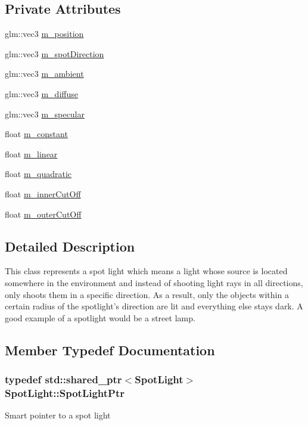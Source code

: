 \subsection*{Private Attributes}
\begin{DoxyCompactItemize}
\item 
glm\+::vec3 \hyperlink{classSpotLight_ab10a89bbb4076364f7f028b750207522}{m\+\_\+position}
\item 
glm\+::vec3 \hyperlink{classSpotLight_ae950bb31005fc7d62232bfc78d1ef8f6}{m\+\_\+spot\+Direction}
\item 
glm\+::vec3 \hyperlink{classSpotLight_a8120c87715c0d55a139562b01f0af3c6}{m\+\_\+ambient}
\item 
glm\+::vec3 \hyperlink{classSpotLight_aba029b38f4ee2b6942bc7c2819621cef}{m\+\_\+diffuse}
\item 
glm\+::vec3 \hyperlink{classSpotLight_a6814d385600a409b73a2877afd545136}{m\+\_\+specular}
\item 
float \hyperlink{classSpotLight_a34d9b43d8bfe559da5d13566ca7882f9}{m\+\_\+constant}
\item 
float \hyperlink{classSpotLight_a9127c53d783524782e2a6f31b8702173}{m\+\_\+linear}
\item 
float \hyperlink{classSpotLight_a6d81863546c671662f84b71a15328654}{m\+\_\+quadratic}
\item 
float \hyperlink{classSpotLight_a9b7c5db8293b0bab65df4474a578bb5d}{m\+\_\+inner\+Cut\+Off}
\item 
float \hyperlink{classSpotLight_a48ede6ee3dc2397941d4d8b96e6bd76a}{m\+\_\+outer\+Cut\+Off}
\end{DoxyCompactItemize}


\subsection{Detailed Description}
This class represents a spot light which means a light whose source is located somewhere in the environment and instead of shooting light rays in all directions, only shoots them in a specific direction. As a result, only the objects within a certain radius of the spotlight's direction are lit and everything else stays dark. A good example of a spotlight would be a street lamp. 

\subsection{Member Typedef Documentation}
\hypertarget{classSpotLight_ac20419604c70594b85e7c019effd1998}{
\subsubsection[{Spot\+Light\+Ptr}]{\setlength{\rightskip}{0pt plus 5cm}typedef std\+::shared\+\_\+ptr$<${\bf Spot\+Light}$>$ {\bf Spot\+Light\+::\+Spot\+Light\+Ptr}}}\label{classSpotLight_ac20419604c70594b85e7c019effd1998}
Smart pointer to a spot light 

